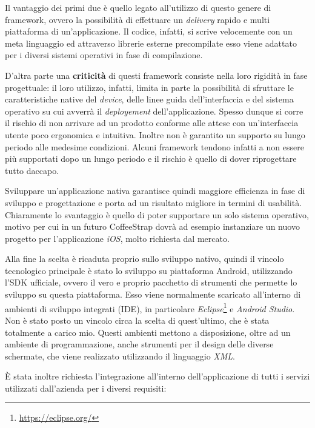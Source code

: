 Il vantaggio dei primi due è quello legato all'utilizzo di questo genere di framework, ovvero la possibilità di effettuare un \textit{delivery} rapido e multi piattaforma di un'applicazione. Il codice, infatti, si scrive velocemente con un meta linguaggio ed attraverso librerie esterne precompilate esso viene adattato per i diversi sistemi operativi in fase di compilazione. 

D'altra parte una \textbf{criticità} di questi framework consiste nella loro rigidità in fase progettuale: il loro utilizzo, infatti, limita in parte la possibilità di sfruttare le caratteristiche native del \textit{device}, delle linee guida dell'interfaccia e del sistema operativo su cui avverrà il \textit{deployement} dell'applicazione. Spesso dunque si corre il rischio di non arrivare ad un prodotto conforme alle attese con un'interfaccia utente poco ergonomica e intuitiva. Inoltre non è garantito un supporto su lungo periodo alle medesime condizioni. Alcuni framework tendono infatti a non essere più supportati dopo un lungo periodo e il rischio è quello di dover riprogettare tutto daccapo.

Sviluppare un'applicazione nativa garantisce quindi maggiore efficienza in fase di sviluppo e progettazione e porta ad un risultato migliore in termini di usabilità. Chiaramente lo svantaggio è quello di poter supportare un solo sistema operativo, motivo per cui in un futuro CoffeeStrap dovrà ad esempio instanziare un nuovo progetto per l'applicazione \textit{iOS}, molto richiesta dal mercato.

Alla fine la scelta è ricaduta proprio sullo sviluppo nativo, quindi il vincolo tecnologico principale è stato lo sviluppo su piattaforma Android, utilizzando l'SDK ufficiale, ovvero il vero e proprio pacchetto di strumenti che permette lo sviluppo su questa piattaforma. Esso viene normalmente scaricato all'interno di ambienti di sviluppo integrati (IDE), in particolare \textit{Eclipse}\footnote{\url{https://eclipse.org/}} e \textit{Android Studio}. Non è stato posto un vincolo circa la scelta di quest'ultimo, che è stata totalmente a carico mio. Questi ambienti mettono a disposizione, oltre ad un ambiente di programmazione, anche strumenti per il design delle diverse schermate, che viene realizzato utilizzando il linguaggio \textit{XML}. 

È stata inoltre richiesta l'integrazione all'interno dell'applicazione di tutti i servizi utilizzati dall'azienda per i diversi requisiti:

